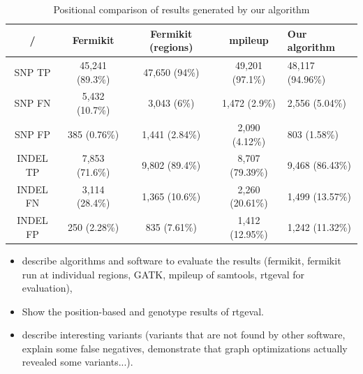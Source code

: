 \begin{table}[h]
\begin{center}
\caption{Positional comparison of results generated by our algorithm}
\label{tab:positional-results}
\begin{tabular}{| c | c | c | c | p{3cm} |}
\hline
/ & Fermikit & Fermikit (regions) & mpileup & Our algorithm \\
\hline
SNP TP & 45,241 (89.3\%) & 47,650 (94\%) & 49,201 (97.1\%) & 48,117 (94.96\%) \\
\hline
SNP FN & 5,432 (10.7\%) & 3,043 (6\%) & 1,472 (2.9\%) & 2,556 (5.04\%) \\
\hline
SNP FP & 385 (0.76\%) & 1,441 (2.84\%) & 2,090 (4.12\%) & 803 (1.58\%) \\
\hline
INDEL TP & 7,853 (71.6\%) & 9,802 (89.4\%) & 8,707 (79.39\%) & 9,468 (86.43\%) \\
\hline
INDEL FN & 3,114 (28.4\%) & 1,365 (10.6\%) & 2,260 (20.61\%) & 1,499 (13.57\%) \\
\hline
INDEL FP & 250 (2.28\%) & 835 (7.61\%) & 1,412 (12.95\%) & 1,242 (11.32\%) \\
\hline
\end{tabular}
\end{center}
\end{table}

\begin{itemize}
\item describe algorithms and software to evaluate the results (fermikit, fermikit run at individual regions, GATK, mpileup of samtools, rtgeval for evaluation),
\item Show the position-based and genotype results of rtgeval.
\item describe interesting variants (variants that are not found by other software, explain some false negatives, demonstrate that graph optimizations actually revealed some variants...).
\end{itemize}
